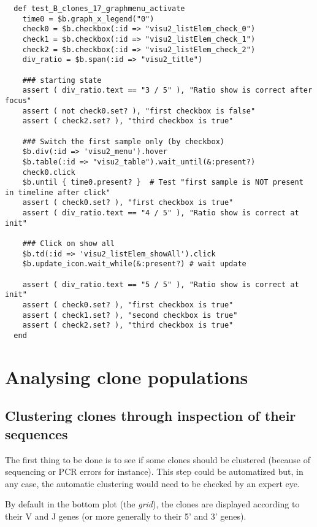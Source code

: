 \begin{verbatim}
  def test_B_clones_17_graphmenu_activate
    time0 = $b.graph_x_legend("0")
    check0 = $b.checkbox(:id => "visu2_listElem_check_0")
    check1 = $b.checkbox(:id => "visu2_listElem_check_1")
    check2 = $b.checkbox(:id => "visu2_listElem_check_2")
    div_ratio = $b.span(:id => "visu2_title")
    
    ### starting state
    assert ( div_ratio.text == "3 / 5" ), "Ratio show is correct after focus"
    assert ( not check0.set? ), "first checkbox is false"
    assert ( check2.set? ), "third checkbox is true"

    ### Switch the first sample only (by checkbox)
    $b.div(:id => 'visu2_menu').hover
    $b.table(:id => "visu2_table").wait_until(&:present?)
    check0.click
    $b.until { time0.present? }  # Test "first sample is NOT present in timeline after click"
    assert ( check0.set? ), "first checkbox is true"
    assert ( div_ratio.text == "4 / 5" ), "Ratio show is correct at init"

    ### Click on show all
    $b.td(:id => 'visu2_listElem_showAll').click
    $b.update_icon.wait_while(&:present?) # wait update

    assert ( div_ratio.text == "5 / 5" ), "Ratio show is correct at init"
    assert ( check0.set? ), "first checkbox is true"
    assert ( check1.set? ), "second checkbox is true"
    assert ( check2.set? ), "third checkbox is true"
  end
\end{verbatim}

\section{Analysing clone populations}

\subsection{Clustering clones through inspection of their sequences}

The first thing to be done is to see if some clones should be clustered (because
of sequencing or PCR errors for instance). This step could be automatized
but, in any case, the automatic clustering would need to be checked by an expert
eye.

By default in the bottom plot (the \textit{grid}), the clones
  are displayed according to their V and J genes (or more generally to their
  5' and 3' genes). 

